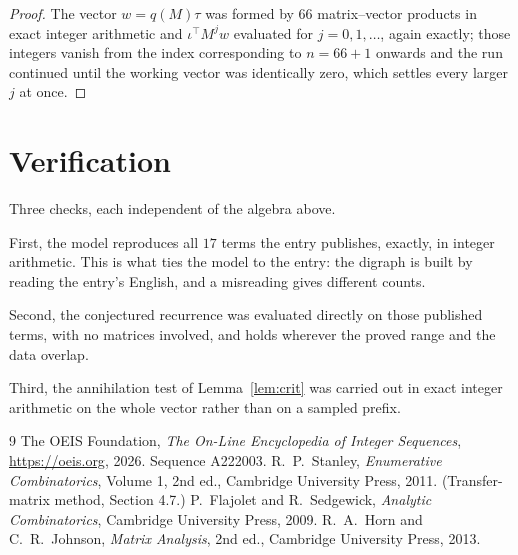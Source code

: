 \documentclass[11pt,a4paper]{article}
\theoremstyle{plain}
\theoremstyle{definition}
\begin{document}
\begin{proof}
The vector $w=q(M)\tau$ was formed by $66$ matrix--vector products in exact integer
arithmetic and $\iota^{\!\top}M^{j}w$ evaluated for $j=0,1,\dots$, again exactly; those
integers vanish from the index corresponding to $n=66+1$ onwards and the run continued
until the working vector was identically zero, which settles every larger $j$ at once.
\end{proof}

\section{Verification}

Three checks, each independent of the algebra above.

First, the model reproduces all $17$ terms the entry publishes, exactly, in integer
arithmetic. This is what ties the model to the entry: the digraph is built by reading the
entry's English, and a misreading gives different counts.

Second, the conjectured recurrence was evaluated directly on those published terms, with no
matrices involved, and holds wherever the proved range and the data overlap.

Third, the annihilation test of Lemma~\ref{lem:crit} was carried out in exact integer
arithmetic on the whole vector rather than on a sampled prefix.

\begin{thebibliography}{9}
 The OEIS Foundation, \emph{The On-Line Encyclopedia of Integer
Sequences}, \url{https://oeis.org}, 2026. Sequence A222003.
 R.~P.~Stanley, \emph{Enumerative Combinatorics}, Volume 1, 2nd ed.,
Cambridge University Press, 2011. (Transfer-matrix method, Section 4.7.)
 P.~Flajolet and R.~Sedgewick, \emph{Analytic Combinatorics}, Cambridge
University Press, 2009.
 R.~A.~Horn and C.~R.~Johnson, \emph{Matrix Analysis}, 2nd ed., Cambridge
University Press, 2013.
\end{thebibliography}
\end{document}
